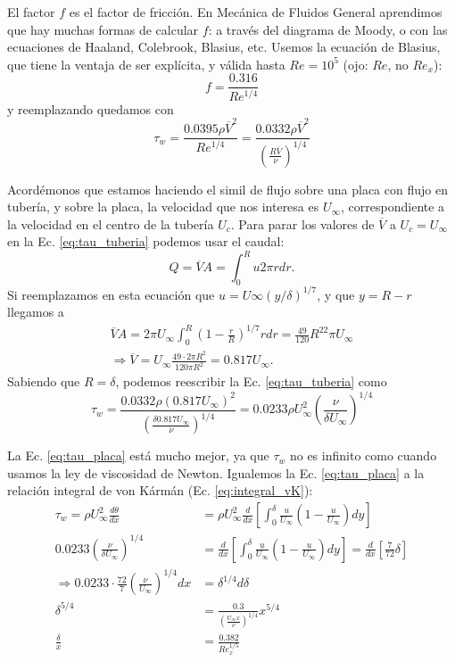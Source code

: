 El factor $f$ es el factor de fricción.
En Mecánica de Fluidos General aprendimos que hay muchas formas de calcular $f$: a través del diagrama de Moody, o con las ecuaciones de Haaland, Colebrook, Blasius, etc.
Usemos la ecuación de Blasius, que tiene la ventaja de ser explícita, y válida hasta $Re=10^5$ (ojo: $Re$, no $Re_x$):
%
\begin{equation}
f = \frac{0.316}{Re^{1/4}}
\end{equation}
%
y reemplazando quedamos con 
%
\begin{equation}\label{eq:tau_tuberia}
\tau_w = \frac{0.0395\rho\overline{V}^2}{Re^{1/4}} = \frac{0.0332\rho\overline{V}^2}{\left(\frac{R\overline{V}}{\nu}\right)^{1/4}}
\end{equation}

Acordémonos que estamos haciendo el simil de flujo sobre una placa con flujo en tubería, y sobre la placa, la velocidad que nos interesa es $U_\infty$, correspondiente a la velocidad en el centro de la tubería $U_c$.
Para parar los valores de $\overline{V}$ a $U_c=U_\infty$ en la Ec. \eqref{eq:tau_tuberia} podemos usar el caudal:
%
\begin{equation}
Q = \overline{V}A = \int_0^Ru2\pi r dr.
\end{equation}
%
Si reemplazamos en esta ecuación que $u=U\infty(y/\delta)^{1/7}$, y que $y=R-r$ llegamos a
%
\begin{align}
\overline{V}A=2\pi U_\infty\int_0^R\left(1-\frac{r}{R}\right)^{1/7}rdr = \frac{49}{120}R^22\pi U_\infty\nonumber\\
\Rightarrow \overline{V} = U_\infty\frac{49\cdot2\pi R^2}{120\pi R^2} = 0.817 U_\infty.
\end{align}
%
Sabiendo que $R=\delta$, podemos reescribir la Ec. \eqref{eq:tau_tuberia} como
%
\begin{equation}\label{eq:tau_placa}
\tau_w = \frac{0.0332\rho(0.817 U_\infty)^2}{\left(\frac{\delta0.817 U_\infty}{\nu}\right)^{1/4}} = 0.0233\rho U_\infty^2\left(\frac{\nu}{\delta U_\infty}\right)^{1/4}
\end{equation}

La Ec. \eqref{eq:tau_placa} está mucho mejor, ya que $\tau_w$ no es infinito como cuando usamos la ley de viscosidad de Newton.
Igualemos la Ec. \eqref{eq:tau_placa} a la relación integral de von Kármán (Ec. \eqref{eq:integral_vK}):
%
\begin{align}
\tau_w = \rho U_\infty^2\frac{d\theta}{dx} &= \rho U_\infty^2 \frac{d}{dx}\left[\int_0^\delta \frac{u}{U_\infty}\left(1-\frac{u}{U_\infty}\right)dy\right]\nonumber\\
0.0233 \left(\frac{\nu}{\delta U_\infty}\right)^{1/4} &= \frac{d}{dx}\left[\int_0^\delta \frac{u}{U_\infty}\left(1-\frac{u}{U_\infty}\right)dy\right] = \frac{d}{dx}\left[\frac{7}{72}\delta\right]\nonumber\\
\Rightarrow 0.0233\cdot\frac{72}{7}\left(\frac{\nu}{U_\infty}\right)^{1/4} dx &= \delta^{1/4}d\delta\nonumber\\
\delta^{5/4} &= \frac{0.3}{\left(\frac{U_\infty x}{\nu}\right)^{1/4}}x^{5/4}\nonumber\\
\frac{\delta}{x} &= \frac{0.382}{Re_x^{1/5}}
\end{align}



